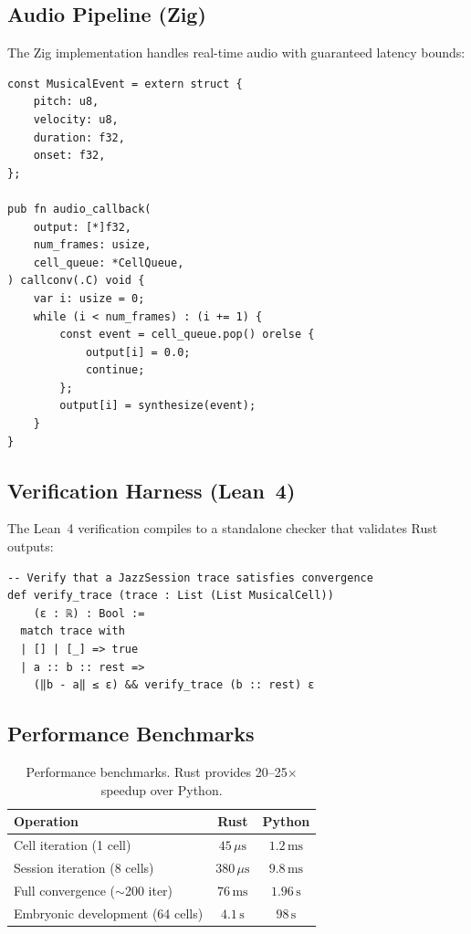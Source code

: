 \documentclass[11pt,a4paper]{article}
\begin{document}
\subsection{Audio Pipeline (Zig)}

The Zig implementation handles real-time audio with guaranteed latency bounds:

\begin{lstlisting}[language=Zig, caption={Audio output in Zig}]
const MusicalEvent = extern struct {
    pitch: u8,
    velocity: u8,
    duration: f32,
    onset: f32,
};

pub fn audio_callback(
    output: [*]f32,
    num_frames: usize,
    cell_queue: *CellQueue,
) callconv(.C) void {
    var i: usize = 0;
    while (i < num_frames) : (i += 1) {
        const event = cell_queue.pop() orelse {
            output[i] = 0.0;
            continue;
        };
        output[i] = synthesize(event);
    }
}
\end{lstlisting}

\subsection{Verification Harness (Lean~4)}

The Lean~4 verification compiles to a standalone checker that validates Rust outputs:

\begin{lstlisting}[language=Lean]
-- Verify that a JazzSession trace satisfies convergence
def verify_trace (trace : List (List MusicalCell))
    (ε : ℝ) : Bool :=
  match trace with
  | [] | [_] => true
  | a :: b :: rest =>
    (‖b - a‖ ≤ ε) && verify_trace (b :: rest) ε
\end{lstlisting}

\subsection{Performance Benchmarks}

\begin{table}[h]
\centering
\begin{tabular}{@{}lcc@{}}
\toprule
\textbf{Operation} & \textbf{Rust} & \textbf{Python} \\
\midrule
Cell iteration (1 cell) & $45\,\mu\text{s}$ & $1.2\,\text{ms}$ \\
Session iteration (8 cells) & $380\,\mu\text{s}$ & $9.8\,\text{ms}$ \\
Full convergence ($\sim$200 iter) & $76\,\text{ms}$ & $1.96\,\text{s}$ \\
Embryonic development (64 cells) & $4.1\,\text{s}$ & $98\,\text{s}$ \\
\bottomrule
\end{tabular}
\caption{Performance benchmarks. Rust provides 20--25$\times$ speedup over Python.}
\label{tab:perf}
\end{table}
\end{document}
